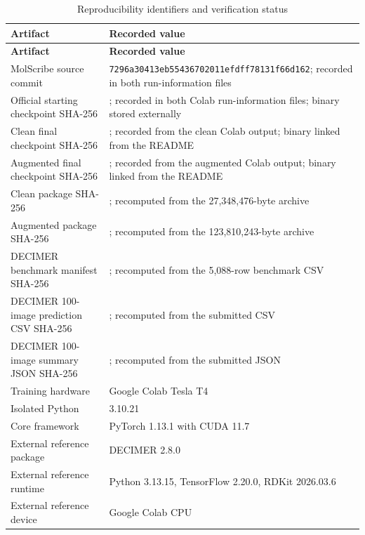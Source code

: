 \documentclass[11pt,a4paper]{article}
\begin{document}
\small
\begin{longtable}{L{5.1cm}L{9.1cm}}
\caption{Reproducibility identifiers and verification status}\label{tab:hashes}\\
\toprule
\textbf{Artifact} & \textbf{Recorded value} \\
\midrule
\endfirsthead
\toprule
\textbf{Artifact} & \textbf{Recorded value} \\
\midrule
\endhead
MolScribe source commit & \texttt{7296a30413eb55436702011efdff78131f66d162}; recorded in both run-information files \\
Official starting checkpoint SHA-256 & ; recorded in both Colab run-information files; binary stored externally \\
Clean final checkpoint SHA-256 & ; recorded from the clean Colab output; binary linked from the README \\
Augmented final checkpoint SHA-256 & ; recorded from the augmented Colab output; binary linked from the README \\
Clean package SHA-256 & ; recomputed from the 27,348,476-byte archive \\
Augmented package SHA-256 & ; recomputed from the 123,810,243-byte archive \\
DECIMER benchmark manifest SHA-256 & ; recomputed from the 5,088-row benchmark CSV \\
DECIMER 100-image prediction CSV SHA-256 & ; recomputed from the submitted CSV \\
DECIMER 100-image summary JSON SHA-256 & ; recomputed from the submitted JSON \\
Training hardware & Google Colab Tesla T4 \\
Isolated Python & 3.10.21 \\
Core framework & PyTorch 1.13.1 with CUDA 11.7 \\
External reference package & DECIMER 2.8.0 \\
External reference runtime & Python 3.13.15, TensorFlow 2.20.0, RDKit 2026.03.6 \\
External reference device & Google Colab CPU \\
\bottomrule
\end{longtable}
\normalsize
\end{document}
